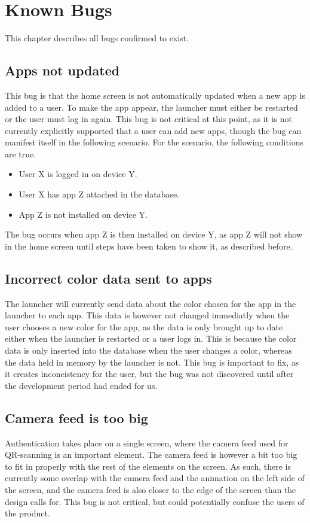 \chapter{Known Bugs}
\label{test:known_bugs}
This chapter describes all bugs confirmed to exist. 

\section*{Apps not updated}
This bug is that the home screen is not automatically updated when a new app is added to a user. 
To make the app appear, the launcher must either be restarted or the user must log in again. 
This bug is not critical at this point, as it is not currently explicitly supported that a user can add new apps, though the bug can manifest itself in the following scenario.\newline
For the scenario, the following conditions are true.

\begin{itemize}
	\item User X is logged in on device Y.
	\item User X has app Z attached in the database. 
	\item App Z is not installed on device Y.
\end{itemize}

The bug occurs when app Z is then installed on device Y, as app Z will not show in the home screen until steps have been taken to show it, as described before. 

\section*{Incorrect color data sent to apps}
The launcher will currently send data about the color chosen for the app in the launcher to each app. 
This data is however not changed immediatly when the user chooses a new color for the app, as the data is only brought up to date either when the launcher is restarted or a user logs in. 
This is because the color data is only inserted into the database when the user changes a color, whereas the data held in memory by the launcher is not. 
This bug is important to fix, as it creates inconcistency for the user, but the bug was not discovered until after the development period had ended for us. 

\section*{Camera feed is too big}
Authentication takes place on a single screen, where the camera feed used for QR-scanning is an important element. 
The camera feed is however a bit too big to fit in properly with the rest of the elements on the screen. 
As such, there is currently some overlap with the camera feed and the animation on the left side of the screen, and the camera feed is also closer to the edge of the screen than the design calls for.
This bug is not critical, but could potentially confuse the users of the product. 